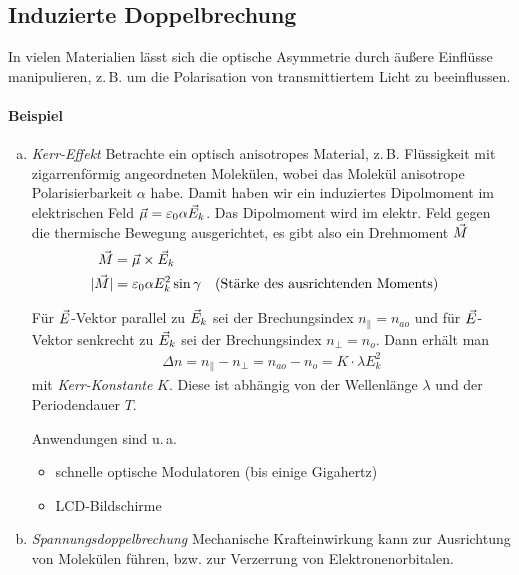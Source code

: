 
\subsection{Induzierte Doppelbrechung}
In vielen Materialien lässt sich die optische Asymmetrie durch äußere
Einflüsse manipulieren, z.\,B. um die Polarisation von transmittiertem
Licht zu beeinflussen.
\paragraph{Beispiel}
\begin{enumerate}[a)]
\item \emph{Kerr-Effekt}
  Betrachte ein optisch anisotropes Material, z.\,B. Flüssigkeit mit
  zigarrenförmig angeordneten Molekülen, wobei das Molekül anisotrope
  Polarisierbarkeit $\alpha$ habe.
  Damit haben wir ein induziertes Dipolmoment im elektrischen Feld
  $\vec{\mu} = \varepsilon_0\alpha\vec{E}_k$.
  Das Dipolmoment wird im elektr. Feld gegen die thermische Bewegung
  ausgerichtet, es gibt also ein Drehmoment
  $\vec{M}$
  \begin{align*}
    \vec{M} &= \vec{\mu}\times \vec{E}_k\\
    |\vec{M}| &= \varepsilon_0\alpha E_k^2\sin\gamma 
          &&\text{(Stärke des ausrichtenden Moments)}
  \end{align*}
  
  Für $\vec{E}$-Vektor parallel zu $\vec{E}_k$ sei der
  Brechungsindex $n_\parallel=n_{ao}$ und für
  $\vec{E}$-Vektor senkrecht zu $\vec{E}_k$ sei der
  Brechungsindex $n_\bot=n_{o}$. Dann erhält man
  \begin{gather*}
    \Delta n = n_\parallel - n_\bot = n_{ao}-n_o =
    K\cdot \lambda E_k^2
  \end{gather*}%
  mit \emph{Kerr-Konstante} $K$.
  Diese ist abhängig von der Wellenlänge $\lambda$ und der Periodendauer
  $T$.
  
  Anwendungen sind u.\,a.
  \begin{itemize}
  \item schnelle optische Modulatoren (bis einige Gigahertz)
  \item LCD-Bildschirme
  \end{itemize}
  
  \item \emph{Spannungsdoppelbrechung}
    Mechanische Krafteinwirkung kann zur Ausrichtung von Molekülen
    führen, bzw. zur Verzerrung von Elektronenorbitalen.
\end{enumerate}





